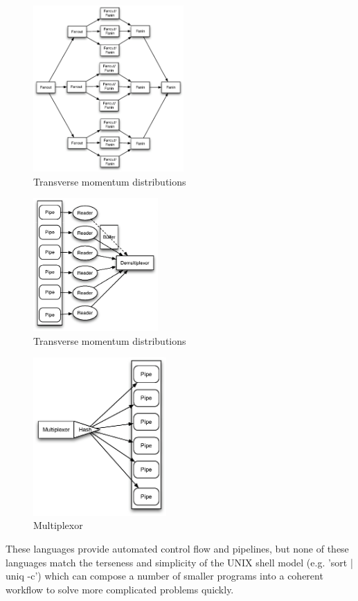 \documentclass[11pt, letterpaper]{article}
\begin{document}
\renewcommand{\topfraction}{0.85}
\renewcommand{\textfraction}{0.1}
\begin{figure}[htp]
\centering
\includegraphics[height=2.5in]{fofigraph.eps}
\caption{Transverse momentum distributions}\label{fig:fofigraph}
\end{figure}
\begin{figure}[htp]
\centering
\includegraphics[height=2.0in]{demux.eps}
\caption{Transverse momentum distributions}\label{fig:demux}
\end{figure}
\begin{figure}[htp]
\centering
\includegraphics[width=2.0in]{mux.eps}
\caption{Multiplexor}\label{fig:mux}
\end{figure}
These languages provide automated control flow and pipelines, but none of these languages match the terseness and simplicity of the UNIX shell model (e.g. 'sort | uniq -c') which can compose a number of smaller programs into a coherent workflow to solve more complicated problems quickly. 
\end{document}

